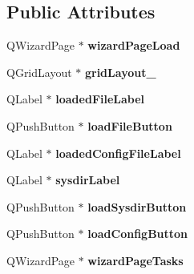 \subsection*{Public Attributes}
\begin{DoxyCompactItemize}
\item 
\hypertarget{class_ui___wizard_a593dd7776e690db14bc5d1978b2ca96f}{}Q\+Wizard\+Page $\ast$ {\bfseries wizard\+Page\+Load}\label{class_ui___wizard_a593dd7776e690db14bc5d1978b2ca96f}

\item 
\hypertarget{class_ui___wizard_ab8332309b854addbca78ed6dd9355381}{}Q\+Grid\+Layout $\ast$ {\bfseries grid\+Layout\+\_}\label{class_ui___wizard_ab8332309b854addbca78ed6dd9355381}

\item 
\hypertarget{class_ui___wizard_a8a8caaa62eaac3b495975dae8dbd8a09}{}Q\+Label $\ast$ {\bfseries loaded\+File\+Label}\label{class_ui___wizard_a8a8caaa62eaac3b495975dae8dbd8a09}

\item 
\hypertarget{class_ui___wizard_a6805cbd003279c9e8e7b8f5a5b582356}{}Q\+Push\+Button $\ast$ {\bfseries load\+File\+Button}\label{class_ui___wizard_a6805cbd003279c9e8e7b8f5a5b582356}

\item 
\hypertarget{class_ui___wizard_a0bf86f996fa4297f08ca8cc681007474}{}Q\+Label $\ast$ {\bfseries loaded\+Config\+File\+Label}\label{class_ui___wizard_a0bf86f996fa4297f08ca8cc681007474}

\item 
\hypertarget{class_ui___wizard_abfe58822e5839d6c013418c08d05f718}{}Q\+Label $\ast$ {\bfseries sysdir\+Label}\label{class_ui___wizard_abfe58822e5839d6c013418c08d05f718}

\item 
\hypertarget{class_ui___wizard_a9dee27024353f55b77bd2e27f21abc0c}{}Q\+Push\+Button $\ast$ {\bfseries load\+Sysdir\+Button}\label{class_ui___wizard_a9dee27024353f55b77bd2e27f21abc0c}

\item 
\hypertarget{class_ui___wizard_a7f739a54ec930c446638a01bf14ff0be}{}Q\+Push\+Button $\ast$ {\bfseries load\+Config\+Button}\label{class_ui___wizard_a7f739a54ec930c446638a01bf14ff0be}

\item 
\hypertarget{class_ui___wizard_a0838e504fcf3d60d112fd695b8ad3687}{}Q\+Wizard\+Page $\ast$ {\bfseries wizard\+Page\+Tasks}\label{class_ui___wizard_a0838e504fcf3d60d112fd695b8ad3687}


\end{DoxyCompactItemize}
